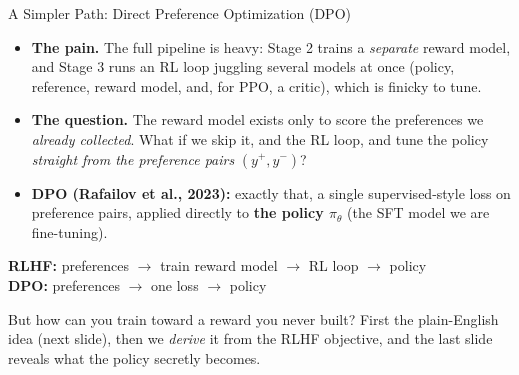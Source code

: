 \begin{frame}{A Simpler Path: Direct Preference Optimization (DPO)}
\begin{itemize}\itemsep0.45em\small
    \item \textbf{The pain.} The full pipeline is heavy: Stage 2 trains a
          \emph{separate} reward model, and Stage 3 runs an RL loop juggling several
          models at once (policy, reference, reward model, and, for PPO, a
          critic), which is finicky to tune.
    \item \textbf{The question.} The reward model exists only to score the
          preferences we \emph{already collected}. What if we skip it, and the RL
          loop, and tune the policy \emph{straight from the preference pairs}
          $(y^+, y^-)$?
    \item \textbf{DPO (Rafailov et al., 2023):} exactly that, a single
          supervised-style loss on preference pairs, applied directly to
          \textbf{the policy $\pi_\theta$} (the SFT model we are fine-tuning).
\end{itemize}
\vspace{0.4em}
\begin{center}\small
\setlength{\fboxsep}{5pt}%
\colorbox{boxblue!40}{\parbox{0.92\textwidth}{\centering
\textbf{RLHF:}\; preferences $\to$ train reward model $\to$ RL loop $\to$ policy\\[0.3em]
\textbf{DPO:}\;\; preferences $\to$ one loss $\to$ policy}}
\end{center}
\vspace{0.3em}
{\footnotesize But how can you train toward a reward you never built? First the
plain-English idea (next slide), then we \emph{derive} it from the RLHF objective, and the last slide reveals what the policy secretly becomes.}
\end{frame}

